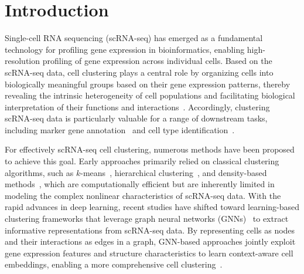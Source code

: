 \section{Introduction}
\label{sec::intro}
Single-cell RNA sequencing (scRNA-seq) has emerged as a fundamental technology for profiling gene expression in bioinformatics, enabling high-resolution profiling of gene expression across individual cells. Based on the scRNA-seq data, cell clustering plays a central role by organizing cells into biologically meaningful groups based on their gene expression patterns, thereby revealing the intrinsic heterogeneity of cell populations and facilitating biological interpretation of their functions and interactions~\cite{kiselev2019challenges,peng2020single}. Accordingly, clustering scRNA-seq data is particularly valuable for a range of downstream tasks, including marker gene annotation~\cite{dai2022accurate} and cell type identification~\cite{hu2020iterative}.

For effectively scRNA-seq cell clustering, numerous methods have been proposed to achieve this goal. Early approaches primarily relied on classical clustering algorithms, such as $k$-means~\cite{hicks2021mbkmeans}, hierarchical clustering~\cite{johnson1967hierarchical}, and density-based methods~\cite{petegrosso2020machine}, which are computationally efficient but are inherently limited in modeling the complex nonlinear characteristics of scRNA-seq data. With the rapid advances in deep learning, recent studies have shifted toward learning-based clustering frameworks that leverage graph neural networks (GNNs)~\cite{ju2025survey,fan2026cmgl} to extract informative representations from scRNA-seq data. By representing cells as nodes and their interactions as edges in a graph, GNN-based approaches jointly exploit gene expression features and structure characteristics to learn context-aware cell embeddings, enabling a more comprehensive cell clustering~\cite{wang2021scgnn,gan2022deep,xu2024sccdcg,xu2025scsiameseclu,zhang2026evidence}.



